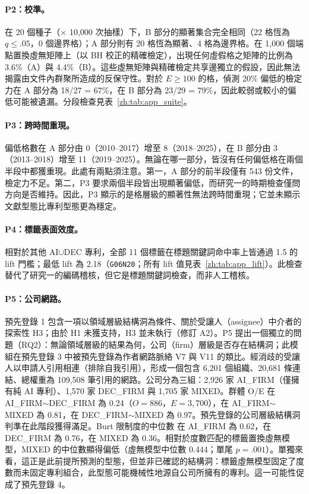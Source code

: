 \paragraph{P2：校準。} 在 20 個種子（$\times$ 10,000 次抽樣）下，B 部分的顯著集合完全相同（22 格恆為 $q \le .05$，0 個邊界格）；A 部分則有 20 格恆為顯著、4 格為邊界格。在 1,000 個端點置換虛無矩陣上（以 BH 校正的精確檢定），出現任何虛假格之矩陣的比例為 3.6\%（A）與 4.4\%（B）。這些虛無矩陣與精確檢定共享邊獨立的假設，因此無法揭露由文件內群聚所造成的反保守性。對於 $E \ge 100$ 的格，偵測 20\% 偏低的檢定力在 A 部分為 18/27 = 67\%，在 B 部分為 23/29 = 79\%，因此較弱或較小的偏低可能被遺漏。分段檢查見表~\ref{zh:tab:app_suite}。

\paragraph{P3：跨時間重現。} 偏低格數在 A 部分由 0（2010--2017）增至 8（2018--2025），在 B 部分由 3（2013--2018）增至 11（2019--2025）。無論在哪一部分，皆沒有任何偏低格在兩個半段中都獲重現。此處有兩點須注意。第一，A 部分的前半段僅有 543 份文件，檢定力不足。第二，P3 要求兩個半段皆出現顯著偏低，而研究一的時期檢查僅問方向是否維持。因此，P3 顯示的是格層級的顯著性無法跨時間重現；它並未顯示文獻型態比專利型態更為穩定。

\paragraph{P4：標籤表面效度。} 相對於其他 AI$\cup$DEC 專利，全部 11 個標籤在標題關鍵詞命中率上皆通過 1.5 的 lift 門檻；最低 lift 為 2.18（\texttt{G06N20}；所有 lift 值見表~\ref{zh:tab:app_lift}）。此檢查替代了研究一的編碼稽核，但它是標題關鍵詞檢查，而非人工稽核。

\paragraph{P5：公司網路。} 預先登錄 1 包含一項以領域層級結構洞為條件、關於受讓人（assignee）中介者的探索性 H3；由於 H1 未獲支持，H3 並未執行（修訂 A2）。P5 提出一個獨立的問題（RQ2）：無論領域層級的結果為何，公司（firm）層級是否存在結構洞；此模組在預先登錄 3 中被預先登錄為作者網路脈絡 V7 與 V11 的類比。經消歧的受讓人以申請人引用相連（排除自我引用），形成一個包含 6,201 個組織、20,681 條連結、總權重為 109,508 筆引用的網路。公司分為三組：2,926 家 AI\_FIRM（僅擁有純 AI 專利）、1,570 家 DEC\_FIRM 與 1,705 家 MIXED。群體 O/E 在 AI\_FIRM$\sim$DEC\_FIRM 為 0.24（$O = 886$，$E = 3{,}700$），在 AI\_FIRM$\sim$MIXED 為 0.81，在 DEC\_FIRM$\sim$MIXED 為 0.97。預先登錄的公司層級結構洞判準在此階段獲得滿足。Burt 限制度的中位數 \citep{burt1992structural} 在 AI\_FIRM 為 0.62，在 DEC\_FIRM 為 0.76，在 MIXED 為 0.36。相對於度數匹配的標籤置換虛無模型，MIXED 的中位數顯得偏低（虛無模型中位數 0.444；單尾 $p = .001$）。單獨來看，這正是此前提所預測的型態，但並非已確認的結構洞：標籤虛無模型固定了度數而未固定專利組合，此型態可能機械性地源自公司所擁有的專利。這一可能性促成了預先登錄 4。

